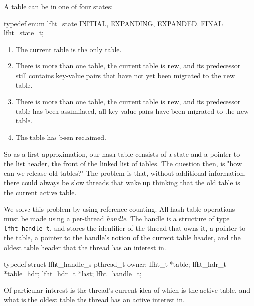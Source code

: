 A table can be in one of four states:

\begin{center}
\begin{clisting}
typedef enum lfht_state { INITIAL, EXPANDING, EXPANDED, FINAL } lfht_state_t;
\end{clisting}
\end{center}

\begin{enumerate}
\item The current table is the only table.

\item  There is more than one table, the current table is new, and its
predecessor still contains key-value pairs that have not yet been
migrated to the new table.

\item There is more than one table, the current table is new, and its
predecessor table has been assimilated, all key-value pairs have been
migrated to the new table.

\item The table has been reclaimed.
\end{enumerate}

So as a first approximation, our hash table consists of a state and a
pointer to the list header, the front of the linked list of tables.
The question then, is "how can we release old tables?" The problem is
that, without additional information, there could always be slow
threads that wake up thinking that the old table is the current active
table.

We solve this problem by using reference counting.
All hash table operations must be made using a per-thread {\em handle\/}. The handle is  a
structure of type \texttt{lfht\_handle\_t}, and stores
the identifier of the thread that owns it, a pointer to the table, a pointer to the handle's notion
of the current table header, and the oldest table header that the thread has an interest in.

\begin{center}
\begin{clisting}
typedef struct lfht_handle_s {
  pthread_t owner;
  lfht_t *table;
  lfht_hdr_t *table_hdr;
  lfht_hdr_t *last;  
} lfht_handle_t;
\end{clisting}
\end{center}

Of particular interest is the thread's current idea of which
is the active table, and what is the oldest table the thread has
an active interest in.


